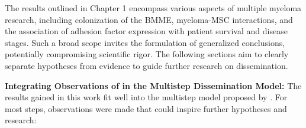 %
\label{sec:discussion_framework}%
The results outlined in Chapter 1 encompass various aspects of multiple myeloma
research, including colonization of the \ac{BMME}, myeloma-\ac{MSC}
interactions, and the association of adhesion factor expression with patient
survival and disease stages. Such a broad scope invites the formulation of
generalized conclusions, potentially compromising scientific rigor. The
following sections aim to clearly separate hypotheses from evidence to guide
further research on dissemination.

\textbf{Integrating Observations of \INA in the Multistep Dissemination Model:}
The results gained in this work fit well into the multistep model proposed by
\citet{zeissigTumourDisseminationMultiple2020}. For most steps, observations
were made that could inspire further hypotheses and research:


